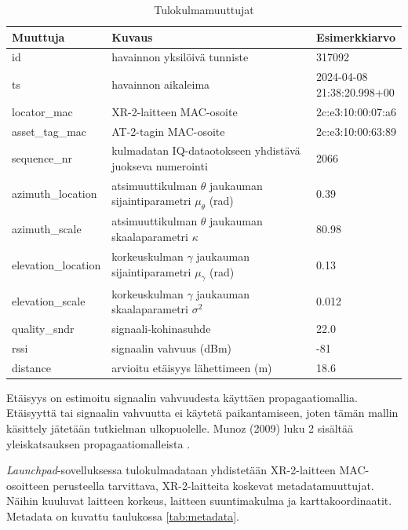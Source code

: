 \documentclass[
  12pt,
  a4paper, twoside]{book}
\begin{document}
\def\arraystretch{1.25} 
\begin{table}[H]
\centering
\begin{tabular}{|l|l|l|}
\hline
Muuttuja & Kuvaus & Esimerkkiarvo\\
\hline
id & havainnon yksilöivä tunniste & 317092 \\
ts & havainnon aikaleima & \makecell[l]{2024-04-08 \\ 21:38:20.998+00}\\
locator\_mac & XR-2-laitteen MAC-osoite & 2c:e3:10:00:07:a6
\\
asset\_tag\_mac & AT-2-tagin MAC-osoite & 2c:e3:10:00:63:89\\
sequence\_nr & \makecell[l]{kulmadatan IQ-dataotokseen yhdistävä \\ juokseva numerointi} & 2066\\
azimuth\_location & \makecell[l]{atsimuuttikulman $\theta$ \\ jaukauman sijaintiparametri $\mu_{\theta}$ (rad)} & 0.39
\\
azimuth\_scale & \makecell[l]{atsimuuttikulman $\theta$ \\ jaukauman skaalaparametri $\kappa$} & 80.98
\\
elevation\_location & \makecell[l]{korkeuskulman $\gamma$ \\ jaukauman sijaintiparametri $\mu_{\gamma}$ (rad)} & 0.13
\\
elevation\_scale & \makecell[l]{korkeuskulman $\gamma$ \\ jaukauman skaalaparametri $\sigma^2$} & 0.012
\\
quality\_sndr & signaali-kohinasuhde & 22.0 \\
rssi & signaalin vahvuus (dBm) & -81\\
distance & arvioitu etäisyys lähettimeen (m) & 18.6\\
\hline
\end{tabular}
\caption{Tulokulmamuuttujat}
\label{tab:aoa-muuttujat}
\end{table}

Etäisyys on estimoitu signaalin vahvuudesta käyttäen propagaatiomallia. Etäisyyttä tai signaalin vahvuutta ei käytetä paikantamiseen, joten tämän mallin käsittely jätetään tutkielman ulkopuolelle. Munoz (2009) luku 2 sisältää yleiskatsauksen propagaatiomalleista \citep{Munoz-2009}.

\emph{Launchpad}-sovelluksessa tulokulmadataan yhdistetään XR-2-laitteen MAC-osoitteen perusteella tarvittava, XR-2-laitteita koskevat metadatamuuttujat. Näihin kuuluvat laitteen korkeus, laitteen suuntimakulma ja karttakoordinaatit. Metadata on kuvattu taulukossa \ref{tab:metadata}.
\end{document}
